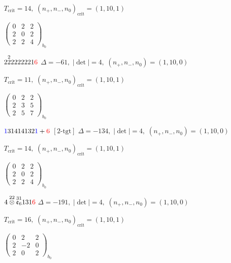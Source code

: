 \documentclass[10pt]{article}
\begin{document}
\hspace{1em}$T_{\text{crit}}=14,\; (n_+,n_-,n_0)_{\text{crit}}=(1,10,1)$

\hspace{2em}$\left(\begin{smallmatrix}0 & 2 & 2 \\ 2 & 0 & 2 \\ 2 & 2 & 4\end{smallmatrix}\right)_{\!b_0}$

\smallskip

$2\overset{2}{2}2222221\textcolor{red}{6}$ \quad $\Delta=-61,\; |\det|=4,\; (n_+,n_-,n_0)=(1,10,0)$

\hspace{1em}$T_{\text{crit}}=11,\; (n_+,n_-,n_0)_{\text{crit}}=(1,10,1)$

\hspace{2em}$\left(\begin{smallmatrix}0 & 2 & 2 \\ 2 & 3 & 5 \\ 2 & 5 & 7\end{smallmatrix}\right)_{\!b_0}$

\smallskip

$\textcolor{blue}{1}31414132\textcolor{blue}{1}+\textcolor{red}{6}$ $\scriptstyle [2\text{-tgt}]$ \quad $\Delta=-134,\; |\det|=4,\; (n_+,n_-,n_0)=(1,10,0)$

\hspace{1em}$T_{\text{crit}}=14,\; (n_+,n_-,n_0)_{\text{crit}}=(1,10,1)$

\hspace{2em}$\left(\begin{smallmatrix}0 & 2 & 2 \\ 2 & 0 & 2 \\ 2 & 2 & 4\end{smallmatrix}\right)_{\!b_0}$

\smallskip

$4\overset{22}{\otimes}\overset{31}{\mathfrak{e}_6}131\textcolor{red}{6}$ \quad $\Delta=-191,\; |\det|=4,\; (n_+,n_-,n_0)=(1,10,0)$

\hspace{1em}$T_{\text{crit}}=16,\; (n_+,n_-,n_0)_{\text{crit}}=(1,10,1)$

\hspace{2em}$\left(\begin{smallmatrix}0 & 2 & 2 \\ 2 & -2 & 0 \\ 2 & 0 & 2\end{smallmatrix}\right)_{\!b_0}$
\end{document}
